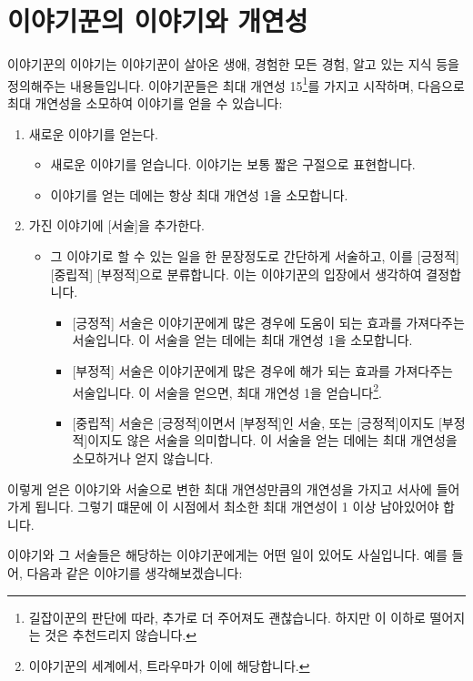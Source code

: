 \documentclass{report}
\begin{document}
	\section*{이야기꾼의 이야기와 개연성}
	이야기꾼의 이야기는 이야기꾼이 살아온 생애, 경험한 모든 경험, 알고 있는 지식 등을 정의해주는 내용들입니다. 이야기꾼들은 최대 개연성 15\footnote{길잡이꾼의 판단에 따라, 추가로 더 주어져도 괜찮습니다. 하지만 이 이하로 떨어지는 것은 추천드리지 않습니다.}를 가지고 시작하며, 다음으로 최대 개연성을 소모하여 이야기를 얻을 수 있습니다:
	\begin{enumerate}
		\item 새로운 이야기를 얻는다.
			\begin{itemize}
				\item 새로운 이야기를 얻습니다. 이야기는 보통 짧은 구절으로 표현합니다.
				
				\item 이야기를 얻는 데에는 항상 최대 개연성 1을 소모합니다.
			\end{itemize}
		
		\item 가진 이야기에 [서술]을 추가한다.
			\begin{itemize}
				\item 그 이야기로 할 수 있는 일을 한 문장정도로 간단하게 서술하고, 이를 [긍정적] [중립적] [부정적]으로 분류합니다. 이는 이야기꾼의 입장에서 생각하여 결정합니다.
					\begin{itemize}
						\item{} [긍정적] 서술은 이야기꾼에게 많은 경우에 도움이 되는 효과를 가져다주는 서술입니다. 이 서술을 얻는 데에는 최대 개연성 1을 소모합니다.
						\item{} [부정적] 서술은 이야기꾼에게 많은 경우에 해가 되는 효과를 가져다주는 서술입니다. 이 서술을 얻으면, 최대 개연성 1을 얻습니다\footnote{이야기꾼의 세계에서, 트라우마가 이에 해당합니다.}.
						\item{} [중립적] 서술은 [긍정적]이면서 [부정적]인 서술, 또는 [긍정적]이지도 [부정적]이지도 않은 서술을 의미합니다. 이 서술을 얻는 데에는 최대 개연성을 소모하거나 얻지 않습니다.
					\end{itemize}
			\end{itemize}
	\end{enumerate}
	이렇게 얻은 이야기와 서술으로 변한 최대 개연성만큼의 개연성을 가지고 서사에 들어가게 됩니다. 그렇기 떄문에 이 시점에서 최소한 최대 개연성이 1 이상 남아있어야 합니다.
	
	이야기와 그 서술들은 해당하는 이야기꾼에게는 어떤 일이 있어도 사실입니다. 예를 들어, 다음과 같은 이야기를 생각해보겠습니다:
	
\end{document}
